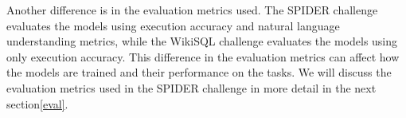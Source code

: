 Another difference is in the evaluation metrics used. The SPIDER challenge evaluates the models using execution accuracy and natural language understanding metrics, while the WikiSQL challenge evaluates the models using only execution accuracy. This difference in the evaluation metrics can affect how the models are trained and their performance on the tasks. We will discuss the evaluation metrics used in the SPIDER challenge in more detail in the next section\ref{eval}.